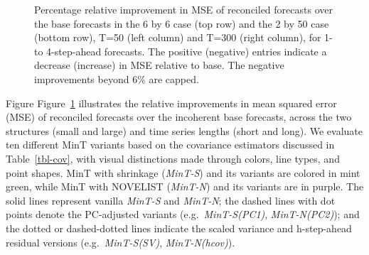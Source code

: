 \documentclass[
  11pt,
  letterpaper,
  DIV=11,
  numbers=noendperiod,
  titlepage]{scrartcl}
\begin{document}
\begin{figure}


\caption{\label{fig-sim-results-1}Percentage relative improvement in MSE
of reconciled forecasts over the base forecasts in the 6 by 6 case (top
row) and the 2 by 50 case (bottom row), T=50 (left column) and T=300
(right column), for 1- to 4-step-ahead forecasts. The positive
(negative) entries indicate a decrease (increase) in MSE relative to
base. The negative improvements beyond 6\% are capped.}

\end{figure}%

Figure Figure~\ref{fig-sim-results-1} illustrates the relative
improvements in mean squared error (MSE) of reconciled forecasts over
the incoherent base forecasts, across the two structures (small and
large) and time series lengths (short and long). We evaluate ten
different MinT variants based on the covariance estimators discussed in
Table~\ref{tbl-cov}, with visual distinctions made through colors, line
types, and point shapes. MinT with shrinkage (\emph{MinT-S}) and its
variants are colored in mint green, while MinT with NOVELIST
(\emph{MinT-N}) and its variants are in purple. The solid lines
represent vanilla \emph{MinT-S} and \emph{MinT-N}; the dashed lines with
dot points denote the PC-adjusted variants (e.g.~\emph{MinT-S(PC1)},
\emph{MinT-N(PC2)}); and the dotted or dashed-dotted lines indicate the
scaled variance and h-step-ahead residual versions
(e.g.~\emph{MinT-S(SV)}, \emph{MinT-N(hcov)}).
\end{document}
